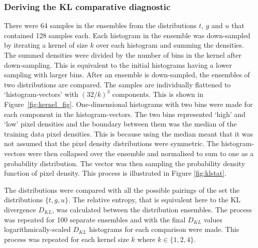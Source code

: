 \documentclass[twocolumn]{article}
\numberwithin{equation}{section}
\begin{document}

\subsubsection{Deriving the KL comparative diagnostic}
There were 64 samples in the ensembles from the distributions $t$, $g$ and $u$ that contained 128 samples each. Each 
histogram in the ensemble was down-sampled by iterating a kernel of size $k$ over each histogram and summing the densities. 
The summed densities were divided by the number of bins in the kernel after down-sampling. This is equivalent to the 
initial histograms having a lower sampling with larger bins. After an ensemble is down-sampled, the ensembles of two 
distributions are compared. The samples are individually flattened to `histogram-vectors' with $(32/k)^3$ components. 
This is shown in Figure~\ref{fig:kernel_fig}. One-dimensional histograms with two bins were made for each component in the 
histogram-vectors. The two bins represented `high' and `low' pixel densities and the boundary between them was the median 
of the training data pixel densities. This is because using the median meant that it was not assumed that the pixel density 
distributions were symmetric. The histogram-vectors were then collapsed over the ensemble and normalised to sum to one as 
a probability distribution. The vector was then sampling the probability density function of pixel density. This process 
is illustrated in Figure \ref{fig:klstat}.

The distributions were compared with all the possible pairings of the set the distributions $\{ t, g, u\}$. The relative 
entropy, that is equivalent here to the KL divergence $D_{KL}$, was calculated between the distribution ensembles. The 
process was repeated for 100 separate ensembles and with the final $D_{KL}$ values logarithmically-scaled $D_{KL}$ 
histograms for each comparison were made. This process was repeated for each kernel size $k$ where $k \in \{1, 2, 4\}$.

\end{document}
